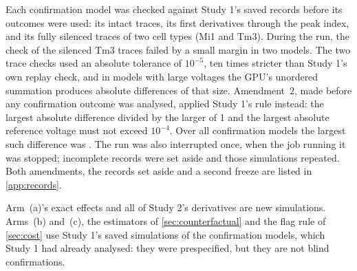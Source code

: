 Each confirmation model was checked against Study 1's saved records before its outcomes were used: its intact traces, its first derivatives through the peak index, and its fully silenced traces of two cell types (Mi1 and Tm3). During the run, the check of the silenced Tm3 traces failed by a small margin in two models. The two trace checks used an absolute tolerance of $10^{-5}$, ten times stricter than Study 1's own replay check, and in models with large voltages the GPU's unordered summation produces absolute differences of that size. Amendment~2, made before any confirmation outcome was analysed, applied Study 1's rule instead: the largest absolute difference divided by the larger of 1 and the largest absolute reference voltage must not exceed $10^{-4}$. Over all confirmation models the largest such difference was \GateNormMax{}. The run was also interrupted once, when the job running it was stopped; incomplete records were set aside and those simulations repeated. Both amendments, the records set aside and a second freeze are listed in \cref{app:records}.

Arm~(a)'s exact effects and all of Study 2's derivatives are new simulations. Arms~(b) and~(c), the estimators of \cref{sec:counterfactual} and the flag rule of \cref{sec:cost} use Study 1's saved simulations of the confirmation models, which Study 1 had already analysed: they were prespecified, but they are not blind confirmations.
